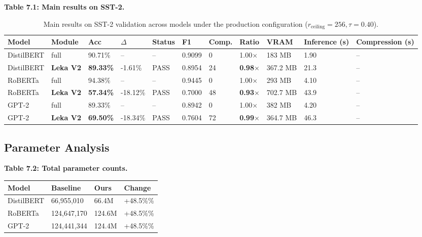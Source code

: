 \textbf{Table 7.1: Main results on SST-2.}

\begin{table}[t]
\centering
\small
\begin{tabular}{lllllllllll}
\toprule
\textbf{Model} & \textbf{Module} & \textbf{Acc} & \textbf{$\Delta$} & \textbf{Status} & \textbf{F1} & \textbf{Comp.} & \textbf{Ratio} & \textbf{VRAM} & \textbf{Inference (s)} & \textbf{Compression (s)} \\
\midrule
DistilBERT & full & 90.71\% & -- & -- & 0.9099 & 0 & 1.00$\times$ & 183 MB & 1.90 & -- \\
DistilBERT & \textbf{Leka V2} & \textbf{89.33\%} & -1.61\% & PASS & 0.8954 & 24 & \textbf{0.98$\times$} & 367.2 MB & 21.3 & -- \\
RoBERTa & full & 94.38\% & -- & -- & 0.9445 & 0 & 1.00$\times$ & 293 MB & 4.10 & -- \\
RoBERTa & \textbf{Leka V2} & \textbf{57.34\%} & -18.12\% & PASS & 0.7000 & 48 & \textbf{0.93$\times$} & 702.7 MB & 43.9 & -- \\
GPT-2 & full & 89.33\% & -- & -- & 0.8942 & 0 & 1.00$\times$ & 382 MB & 4.20 & -- \\
GPT-2 & \textbf{Leka V2} & \textbf{69.50\%} & -18.34\% & PASS & 0.7604 & 72 & \textbf{0.99$\times$} & 364.7 MB & 46.3 & -- \\
\bottomrule
\end{tabular}
\caption{Main results on SST-2 validation across models under the production configuration ($r_{\mathrm{ceiling}}=256, \tau=0.40$).}
\label{tab:main_sst2}
\end{table}

\subsection{Parameter Analysis}

\textbf{Table 7.2: Total parameter counts.}

\begin{table}[H]
\centering
\small
\begin{tabular}{llll}
\toprule
\textbf{Model} & \textbf{Baseline} & \textbf{Ours} & \textbf{Change} \\
\midrule
DistilBERT & 66,955,010 & 66.4M & +48.5\%\% \\
RoBERTa & 124,647,170 & 124.6M & +48.5\%\% \\
GPT-2 & 124,441,344 & 124.4M & +48.5\%\% \\
\bottomrule
\end{tabular}
\end{table}


